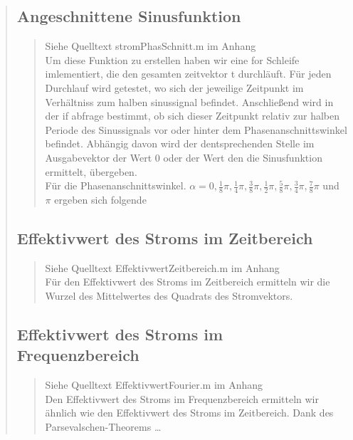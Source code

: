 \begin{quote}
\begin{quote}
    \end{quote}
    
	\subsection{Angeschnittene Sinusfunktion}
    \begin{quote}
        Siehe Quelltext stromPhasSchnitt.m im Anhang\\
        Um diese Funktion zu erstellen haben wir eine for Schleife imlementiert, die den gesamten zeitvektor t
        durchläuft. Für jeden Durchlauf wird getestet, wo sich der jeweilige Zeitpunkt im Verhältniss zum halben
        sinussignal befindet. Anschließend wird in der if abfrage bestimmt, ob sich dieser Zeitpunkt relativ zur halben
        Periode des Sinussignals vor oder hinter dem Phasenanschnittswinkel befindet. Abhängig davon wird der
        dentsprechenden Stelle im Ausgabevektor der Wert $0$ oder der Wert den die Sinusfunktion ermittelt, übergeben.\\
        Für die Phasenanschnittswinkel. $ \alpha = 0, \frac{1}{8} \pi, \frac{1}{4} \pi, \frac{3}{8} \pi, \frac{1}{2}
        \pi,\frac{5}{8} \pi, \frac{3}{4} \pi, \frac{7}{8} \pi$ und $\pi$ ergeben sich folgende 
    \end{quote}
    
    \subsection{Effektivwert des Stroms im Zeitbereich}
    \begin{quote}
        Siehe Quelltext EffektivwertZeitbereich.m im Anhang\\
        Für den Effektivwert des Stroms im Zeitbereich ermitteln wir die Wurzel des Mittelwertes des Quadrats des
        Stromvektors.
    \end{quote}
    
    \subsection{Effektivwert des Stroms im Frequenzbereich}
    \begin{quote}
        Siehe Quelltext EffektivwertFourier.m im Anhang\\
        Den Effektivwert des Stroms im Frequenzbereich ermitteln wir ähnlich wie den Effektivwert des Stroms im
        Zeitbereich. Dank des Parsevalschen-Theorems \ldots
        \end{quote}

\end{quote}
